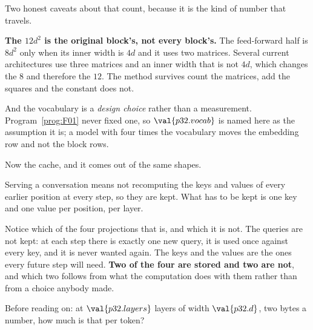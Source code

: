 \begin{fr}
Two honest caveats about that count, because it is the kind of number that
travels.

\begin{warning}
\textbf{The $12d^{2}$ is the original block's, not every block's.} The
feed-forward half is $8d^{2}$ only when its inner width is $4d$ and it uses
two matrices. Several current architectures use three matrices and an inner
width that is not $4d$, which changes the $8$ and therefore the $12$. The
method survives \dash{} count the matrices, add the squares \dash{} and the
constant does not.

And the vocabulary is a \emph{design choice} rather than a measurement.
Program~\ref{prog:F01} never fixed one, so $\val{p32.vocab}$ is named here
as the assumption it is; a model with four times the vocabulary moves the
embedding row and not the block rows.
\end{warning}
\end{fr}

\begin{fr}
Now the cache, and it comes out of the same shapes.

Serving a conversation means not recomputing the keys and values of every
earlier position at every step, so they are kept. What has to be kept is one
key and one value per position, per layer.

Notice which of the four projections that is, and which it is not. The
queries are not kept: at each step there is exactly one new query, it is used
once against every key, and it is never wanted again. The keys and the values
are the ones every future step will need. \textbf{Two of the four are stored
and two are not}, and which two follows from what the computation does with
them rather than from a choice anybody made.

Before reading on: at $\val{p32.layers}$ layers of width $\val{p32.d}$, two
bytes a number, how much is that per token?
\dotline
\nextframe
\end{fr}

